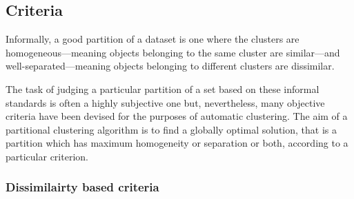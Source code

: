 \documentclass[a4paper]{report}
\begin{document}
\subsection{Criteria}
\label{sec:criteria}

Informally, a good partition of a dataset is one where the clusters are
homogeneous---meaning objects belonging to the same cluster are similar---and
well-separated---meaning objects belonging to different clusters are
dissimilar.

The task of judging a particular partition of a set based on these informal
standards is often a highly subjective one but, nevertheless, many objective
criteria have been devised for the purposes of automatic clustering.  The aim
of a partitional clustering algorithm is to find a globally optimal solution,
that is a partition which has maximum homogeneity or separation or both,
according to a particular criterion.

\subsubsection{Dissimilairty based criteria}
\label{sec:diss-based-crit}
\end{document}
